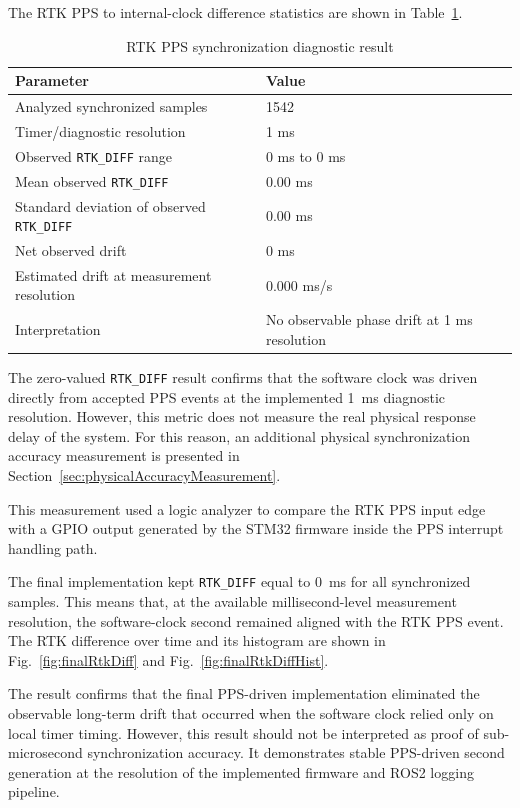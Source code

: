 The RTK PPS to internal-clock difference statistics are shown in Table~\ref{tab:rtkDiffStats}.
\begin{table}[H]
\centering
\caption{RTK PPS synchronization diagnostic result}
\label{tab:rtkDiffStats}
\begin{tabular}{ll}
\hline
Parameter & Value \\
\hline
Analyzed synchronized samples & 1542 \\
Timer/diagnostic resolution & 1 ms \\
Observed \texttt{RTK\_DIFF} range & 0 ms to 0 ms \\
Mean observed \texttt{RTK\_DIFF} & 0.00 ms \\
Standard deviation of observed \texttt{RTK\_DIFF} & 0.00 ms \\
Net observed drift & 0 ms \\
Estimated drift at measurement resolution & 0.000 ms/s \\
Interpretation & No observable phase drift at 1 ms resolution \\
\hline
\end{tabular}
\end{table}

The zero-valued \texttt{RTK\_DIFF} result confirms that the software clock was driven directly from accepted PPS events at the implemented 1~ms diagnostic resolution. However, this metric does not measure the real physical response delay of the system. For this reason, an additional physical synchronization accuracy measurement is presented in Section~\ref{sec:physicalAccuracyMeasurement}.

This measurement used a logic analyzer to compare the RTK PPS input edge with a GPIO output generated by the STM32 firmware inside the PPS interrupt handling path.

The final implementation kept \texttt{RTK\_DIFF} equal to 0~ms for all synchronized samples. This means that, at the available millisecond-level measurement resolution, the software-clock second remained aligned with the RTK PPS event. The RTK difference over time and its histogram are shown in Fig.~\ref{fig:finalRtkDiff} and Fig.~\ref{fig:finalRtkDiffHist}.

The result confirms that the final PPS-driven implementation eliminated the observable long-term drift that occurred when the software clock relied only on local timer timing. However, this result should not be interpreted as proof of sub-microsecond synchronization accuracy. It demonstrates stable PPS-driven second generation at the resolution of the implemented firmware and ROS2 logging pipeline.

